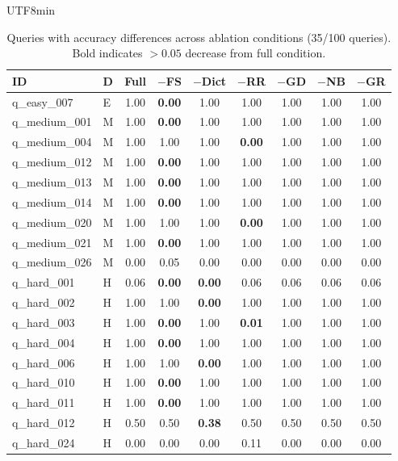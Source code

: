 \documentclass[sn-mathphys,Numbered]{sn-jnl}
\begin{document}
\begin{CJK}{UTF8}{min}
\begin{table}[htbp]
\centering
\caption{Queries with accuracy differences across ablation conditions (35/100 queries). Bold indicates $> 0.05$ decrease from full condition.}
\label{tab:sup_ablation_diff}
\scriptsize
\begin{tabular}{@{}llccccccc@{}}
  \toprule
  ID & D & Full & $-$FS & $-$Dict & $-$RR & $-$GD & $-$NB & $-$GR \\
  \midrule
    q\_easy\_007 & E & 1.00 & \textbf{0.00} & 1.00 & 1.00 & 1.00 & 1.00 & 1.00 \\
    q\_medium\_001 & M & 1.00 & \textbf{0.00} & 1.00 & 1.00 & 1.00 & 1.00 & 1.00 \\
    q\_medium\_004 & M & 1.00 & 1.00 & 1.00 & \textbf{0.00} & 1.00 & 1.00 & 1.00 \\
    q\_medium\_012 & M & 1.00 & \textbf{0.00} & 1.00 & 1.00 & 1.00 & 1.00 & 1.00 \\
    q\_medium\_013 & M & 1.00 & \textbf{0.00} & 1.00 & 1.00 & 1.00 & 1.00 & 1.00 \\
    q\_medium\_014 & M & 1.00 & \textbf{0.00} & 1.00 & 1.00 & 1.00 & 1.00 & 1.00 \\
    q\_medium\_020 & M & 1.00 & 1.00 & 1.00 & \textbf{0.00} & 1.00 & 1.00 & 1.00 \\
    q\_medium\_021 & M & 1.00 & \textbf{0.00} & 1.00 & 1.00 & 1.00 & 1.00 & 1.00 \\
    q\_medium\_026 & M & 0.00 & 0.05 & 0.00 & 0.00 & 0.00 & 0.00 & 0.00 \\
    q\_hard\_001 & H & 0.06 & \textbf{0.00} & \textbf{0.00} & 0.06 & 0.06 & 0.06 & 0.06 \\
    q\_hard\_002 & H & 1.00 & 1.00 & \textbf{0.00} & 1.00 & 1.00 & 1.00 & 1.00 \\
    q\_hard\_003 & H & 1.00 & \textbf{0.00} & 1.00 & \textbf{0.01} & 1.00 & 1.00 & 1.00 \\
    q\_hard\_004 & H & 1.00 & \textbf{0.00} & 1.00 & 1.00 & 1.00 & 1.00 & 1.00 \\
    q\_hard\_006 & H & 1.00 & 1.00 & \textbf{0.00} & 1.00 & 1.00 & 1.00 & 1.00 \\
    q\_hard\_010 & H & 1.00 & \textbf{0.00} & 1.00 & 1.00 & 1.00 & 1.00 & 1.00 \\
    q\_hard\_011 & H & 1.00 & \textbf{0.00} & 1.00 & 1.00 & 1.00 & 1.00 & 1.00 \\
    q\_hard\_012 & H & 0.50 & 0.50 & \textbf{0.38} & 0.50 & 0.50 & 0.50 & 0.50 \\
    q\_hard\_024 & H & 0.00 & 0.00 & 0.00 & 0.11 & 0.00 & 0.00 & 0.00 \\

\end{tabular}
\end{table}
\end{CJK}
\end{document}
